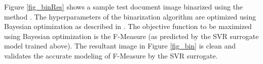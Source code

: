 \documentclass[10pt, a4paper, conference, compsocconf]{IEEEtran}
\begin{document}

Figure \ref{fig_binRes} shows a sample test document image binarized using the method \cite{vats2017automatic}. The hyperparameters of the binarization algorithm are optimized using Bayesian optimization \cite{snoek2012practical} as described in \cite{vats2017automatic}. The objective function to be maximized using Bayesian optimization is the F-Measure (as predicted by the SVR surrogate model trained above). The resultant image in Figure \ref{fig_bin} is clean and validates the accurate modeling of F-Measure by the SVR surrogate.

%
%

\end{document}
